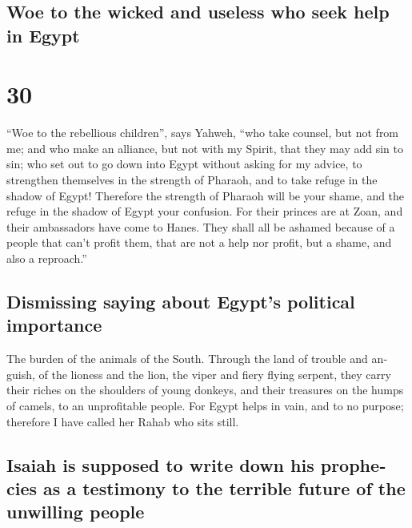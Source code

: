 \begin{paracol}{2}
\switchcolumn
\begin{otherlanguage}{english}

\hypertarget{woe-to-the-wicked-and-useless-who-seek-help-in-egypt}{%
\subsection{Woe to the wicked and useless who seek help in
Egypt}\label{woe-to-the-wicked-and-useless-who-seek-help-in-egypt}}

\hypertarget{section-59}{%
\section{30}\label{section-59}}

 ``Woe to the rebellious children'', says Yahweh, ``who
take counsel, but not from me; and who make an alliance, but not with my
Spirit, that they may add sin to sin;  who set out to go
down into Egypt without asking for my advice, to strengthen themselves
in the strength of Pharaoh, and to take refuge in the shadow of Egypt!
 Therefore the strength of Pharaoh will be your shame, and
the refuge in the shadow of Egypt your confusion.  For
their princes are at Zoan, and their ambassadors have come to Hanes.
 They shall all be ashamed because of a people that can't
profit them, that are not a help nor profit, but a shame, and also a
reproach.''

\hypertarget{dismissing-saying-about-egypts-political-importance}{%
\subsection{Dismissing saying about Egypt's political
importance}\label{dismissing-saying-about-egypts-political-importance}}

 The burden of the animals of the South. Through the land
of trouble and anguish, of the lioness and the lion, the viper and fiery
flying serpent, they carry their riches on the shoulders of young
donkeys, and their treasures on the humps of camels, to an unprofitable
people.  For Egypt helps in vain, and to no purpose;
therefore I have called her Rahab who sits still.

\hypertarget{isaiah-is-supposed-to-write-down-his-prophecies-as-a-testimony-to-the-terrible-future-of-the-unwilling-people}{%
\subsection{Isaiah is supposed to write down his prophecies as a
testimony to the terrible future of the unwilling
people}\label{isaiah-is-supposed-to-write-down-his-prophecies-as-a-testimony-to-the-terrible-future-of-the-unwilling-people}}


\end{otherlanguage}
\end{paracol}
